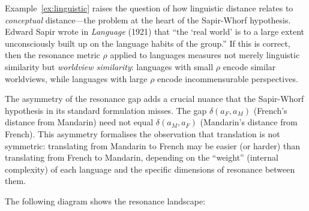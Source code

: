 \begin{interpretation}
\label{interp:ch11:sapir_whorf_distance}
Example~\ref{ex:linguistic} raises the question of how linguistic distance
relates to \emph{conceptual} distance---the problem at the heart of the
Sapir-Whorf hypothesis.  Edward Sapir wrote in \emph{Language} (1921) that
``the `real world' is to a large extent unconsciously built up on the
language habits of the group.''  If this is correct, then the resonance
metric $\rho$ applied to languages measures not merely linguistic
similarity but \emph{worldview similarity}: languages with small $\rho$
encode similar worldviews, while languages with large $\rho$ encode
incommensurable perspectives.

The asymmetry of the resonance gap adds a crucial nuance that the
Sapir-Whorf hypothesis in its standard formulation misses.  The gap
$\delta(a_F, a_M)$ (French's distance from Mandarin) need not equal
$\delta(a_M, a_F)$ (Mandarin's distance from French).  This asymmetry
formalises the observation that translation is not symmetric: translating
from Mandarin to French may be easier (or harder) than translating from
French to Mandarin, depending on the ``weight'' (internal complexity) of
each language and the specific dimensions of resonance between them.
\end{interpretation}



The following diagram shows the resonance landscape:

\begin{center}
\end{center}

